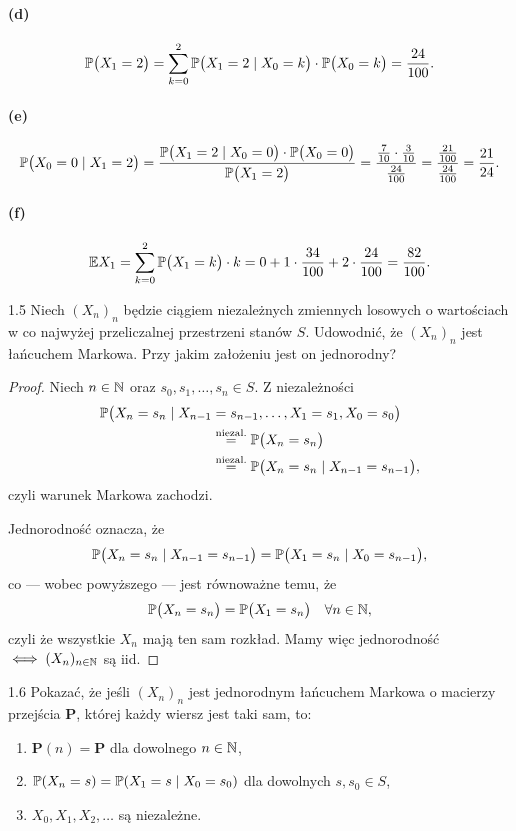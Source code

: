\documentclass[dvipsnames]{book}
\begin{document}
\paragraph{(d)}
\[
  \P\big(X_1 = 2\big)
  = \sum_{k=0}^{2} \P\big(X_1 = 2 \mid X_0 = k\big) \cdot \P\big(X_0 = k\big)
  = \frac{24}{100}.
\]

\paragraph{(e)}
\[
  \P\big(X_0 = 0 \mid X_1 = 2\big)
  = \frac{\P\big(X_1 = 2 \mid X_0 = 0\big) \cdot \P\big(X_0 = 0\big)}
         {\P\big(X_1 = 2\big)}
  = \frac{\frac{7}{10} \cdot \frac{3}{10}}{\frac{24}{100}}
  = \frac{\frac{21}{100}}{\frac{24}{100}}
  = \frac{21}{24}.
\]

\paragraph{(f)}
\[
  \E X_1 = \sum_{k=0}^{2} \P\big(X_1 = k\big) \cdot k
  = 0 + 1 \cdot \frac{34}{100} + 2 \cdot \frac{24}{100} = \frac{82}{100}.
\]

\begin{zadanie}{1.5}
Niech $(X_n)_n$ będzie ciągiem niezależnych zmiennych losowych o wartościach w
co najwyżej przeliczalnej przestrzeni stanów $S$. Udowodnić, że $(X_n)_n$ jest
łańcuchem Markowa. Przy jakim założeniu jest on jednorodny?
\end{zadanie}

\begin{proof}
Niech $n \in \N$ oraz $s_0, s_1, \ldots, s_n \in S$. Z niezależności
\begin{align*}
  \P\big(X_n = s_n \mid X_{n-1} &= s_{n-1}, \ldots, X_1 = s_1, X_0 = s_0\big) \\
  &\overset{\text{niezal.}}{=} \P\big(X_n = s_n\big) \\
  &\overset{\text{niezal.}}{=} \P\big(X_n = s_n \mid X_{n-1} = s_{n-1}\big),
\end{align*}
czyli warunek Markowa zachodzi.

Jednorodność oznacza, że
\[
  \P\big(X_n = s_n \mid X_{n-1} = s_{n-1}\big) = \P\big(X_1 = s_n \mid X_0 = s_{n-1}\big),
\]
co --- wobec powyższego --- jest równoważne temu, że
\[
  \P\big(X_n = s_n\big) = \P\big(X_1 = s_n\big) \quad \forall n \in \N,
\]
czyli że wszystkie $X_n$ mają ten sam rozkład. Mamy więc jednorodność
$\iff (X_n)_{n \in \N}$ są iid.
\end{proof}

\begin{zadanie}{1.6}
Pokazać, że jeśli $(X_n)_n$ jest jednorodnym łańcuchem Markowa o macierzy
przejścia $\mathbf{P}$, której każdy wiersz jest taki sam, to:
\begin{enumerate}
  \item $\mathbf{P}(n) = \mathbf{P}$ dla dowolnego $n \in \N$,
  \item $\P(X_n = s) = \P(X_1 = s \mid X_0 = s_0)$ dla dowolnych $s, s_0 \in S$,
  \item $X_0, X_1, X_2, \ldots$ są niezależne.
\end{enumerate}
\end{zadanie}
\end{document}
